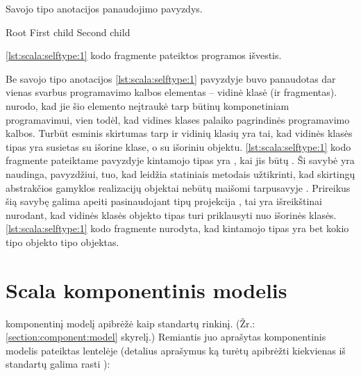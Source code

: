 \begin{listing}[H]
  \caption{Savojo tipo anotacijos panaudojimo pavyzdys.}
  \label{lst:scala:selftype:1}
\end{listing}

\begin{listing}[H]
  \begin{textcode}
    Root
    First child
    Second child
  \end{textcode}
  \caption{\ref{lst:scala:selftype:1} kodo fragmente pateiktos programos
  išvestis.}
  \label{lst:scala:selftype:2}
\end{listing}

Be savojo tipo anotacijos \ref{lst:scala:selftype:1} pavyzdyje buvo
panaudotas dar vienas svarbus programavimo kalbos elementas – vidinė
klasė (ir fragmentas). \cite[12]{scalable-component-abstractions}
nurodo, kad jie šio elemento neįtraukė tarp būtinų komponetiniam
programavimui, vien todėl, kad vidines klases palaiko pagrindinės
 programavimo kalbos. Turbūt esminis skirtumas tarp
 ir  vidinių klasių yra tai, kad
 vidinės klasės tipas yra susietas su išorine klase,
o  su išoriniu objektu. \ref{lst:scala:selftype:1}
kodo fragmente pateiktame pavyzdyje kintamojo  tipas
yra , kai  jis būtų
. Ši savybė yra naudinga, pavyzdžiui, tuo, kad 
leidžia statiniais metodais užtikrinti, kad skirtingų abstrakčios
gamyklos  realizacijų objektai nebūtų maišomi
tarpusavyje \cite[36]{scala-design-patterns}. Prireikus šią savybę
galima apeiti pasinaudojant tipų projekcija ,
tai yra išreikštinai nurodant, kad vidinės klasės objekto tipas
turi priklausyti nuo išorinės klasės. \ref{lst:scala:selftype:1}
kodo fragmente nurodyta, kad kintamojo  tipas yra
bet kokio  tipo objekto  tipo objektas.

\section{Scala komponentinis modelis}

\cite[37]{heineman2001component} komponentinį modelį apibrėžė kaip
standartų rinkinį. (Žr.: \ref{section:component:model} skyrelį.)
Remiantis juo aprašytas  komponentinis modelis
pateiktas lentelėje (detalius aprašymus ką turėtų apibrėžti
kiekvienas iš standartų galima rasti
\cite[38-44]{heineman2001component}):

